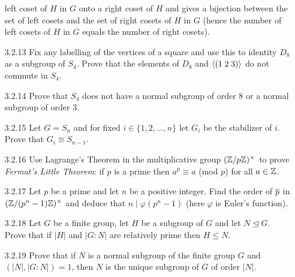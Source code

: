\begin{enumerate}
                  left coset of $H$ in $G$ onto a right coset of $H$ and gives a
                  bijection between the set of left cosets and the set of right
                  cosets of $H$ in $G$ (hence the number of left cosets of $H$
                  in $G$ equals the number of right cosets).
   \item[3.2.13]  Fix any labelling of the vertices of a square and use this to
                  identity $D_8$ as a subgroup of $S_4$. Prove that the elements
                  of $D_8$ and $\langle (1\;2\;3) \rangle$ do not commute in $S_4$.
   \item[3.2.14]  Prove that $S_4$ does not have a normal subgroup of order 8 or
                  a normal subgroup of order 3.
   \item[3.2.15]  Let $G = S_n$ and for fixed $i \in \{1, 2, \ldots, n\}$ let
                  $G_i$ be the stabilizer of $i$. Prove that
                  $G_i \cong S_{n-1}$.
   \item[3.2.16]  Use Lagrange's Theorem in the multiplicative group
                  $(\mathbb{Z}/p\mathbb{Z})^\times$ to prove \textit{Fermat's Little Theorem}:
                  if $p$ is a prime then $a^p \equiv a$ (mod $p$) for all
                  $a \in \mathbb{Z}$.
   \item[3.2.17]  Let $p$ be a prime and let $n$ be a positive integer. Find the
                  order of $\overline{p}$ in $(\mathbb{Z}/(p^n-1)\mathbb{Z})^\times$ and deduce that
                  $n \mid \varphi(p^n - 1)$ (here $\varphi$ is Euler's
                  function).
   \item[3.2.18]  Let $G$ be a finite group, let $H$ be a subgroup of $G$ and
                  let $N \trianglelefteq G$. Prove that if $|H|$ and $|G : N|$
                  are relatively prime then $H \le N$.
   \item[3.2.19]  Prove that if $N$ is a normal subgroup of the finite group $G$
                  and $(|N|, |G : N|) = 1$, then $N$ is the unique subgroup of
                  $G$ of order $|N|$.

\end{enumerate}
